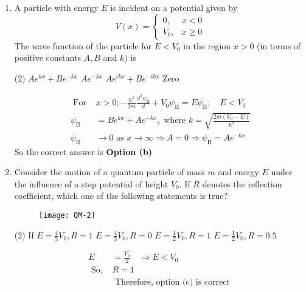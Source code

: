 \begin{enumerate}
\begin{answer}
\end{answer}
	\item A particle with energy $E$ is incident on a potential given by
	$$
	V(x)=\left\{\begin{array}{cc}
	0, & x<0 \\
	V_{0}, & x \geq 0
	\end{array}\right.
	$$
	The wave function of the particle for $E<V_{0}$ in the region $x>0$ (in terms of positive constants $A, B$ and $k)$ is
	 \begin{tasks}(2)
		\task[\textbf{a.}] $A e^{k x}+B e^{-k x}$
		\task[\textbf{b.}]$A e^{-k x}$
		\task[\textbf{c.}]$A e^{i k x}+B e^{-i k x}$
		\task[\textbf{d.}] Zero
	\end{tasks}
\begin{answer}
	$$
	\begin{aligned}
	\text { For } &x>0 ;-\frac{\hbar^{2}}{2 m} \frac{d^{2} \psi_{\mathrm{II}}}{d}+V_{0} \psi_{\mathrm{II}}=E \psi_{\mathrm{II}} ; \quad E<V_{0}\\
	\psi_{\mathrm{II}}&=B e^{k x}+A e^{-k x}, \text { where } k=\sqrt{\frac{2 m\left(V_{0}-E\right)}{\hbar^{2}}}\\
	\psi_{\mathrm{II}} &\rightarrow 0 \text { as } x \rightarrow \infty \Rightarrow A=0 \Rightarrow \psi_{\mathrm{II}}=A e^{-k x}
\end{aligned}
$$
So the correct answer is \textbf{Option (b)}
\end{answer}
	\item Consider the motion of a quantum particle of mass $m$ and energy $E$ under the influence of a step potential of height $V_{0}$. If $R$ denotes the reflection coefficient, which one of the following statements is true?
	\begin{figure}[H]
		\centering
		\texttt{[image: QM-2]}
	\end{figure}
	 \begin{tasks}(2)
		\task[\textbf{a.}]If $E=\frac{4}{3} V_{0}, R=1$
		\task[\textbf{b.}]$E=\frac{4}{3} V_{0}, R=0$
		\task[\textbf{c.}]$E=\frac{1}{2} V_{0}, R=1$
		\task[\textbf{d.}] $E=\frac{1}{2} V_{0}, R=0.5$
	\end{tasks}
\begin{answer}
	$$
	\begin{aligned}
	E&=\frac{V_{0}}{2} \quad \Rightarrow E<V_{0}\\
	\text { So, }& R=1\\
	&\text { Therefore, option (c) is correct }
\end{aligned}
$$

\end{answer}
\end{enumerate}
